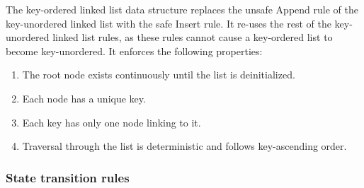 \documentclass[../midgard.tex]{subfiles}
\begin{document}
The key-ordered linked list data structure replaces the unsafe Append rule of the key-unordered linked list with the safe Insert rule. It re-uses the rest of the key-unordered linked list rules, as these rules cannot cause a key-ordered list to become key-unordered. It enforces the following properties:
\begin{enumerate}
    \item The root node exists continuously until the list is deinitialized.
    \item Each node has a unique key.
    \item Each key has only one node linking to it.
    \item Traversal through the list is deterministic and follows key-ascending order.
\end{enumerate}

\subsubsection{State transition rules}
\label{h:key-ordered-list-state-transition-rules}
\end{document}
